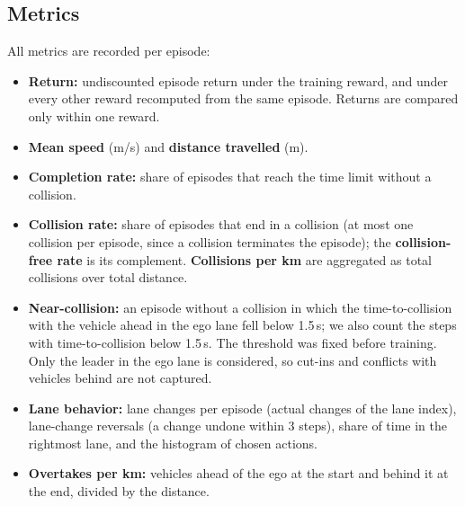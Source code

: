 \subsection{Metrics}\label{sec:metrics}
All metrics are recorded per episode:
\begin{itemize}
  \item \textbf{Return:} undiscounted episode return under the training reward, and under every other reward
        recomputed from the same episode. Returns are compared only within one reward.
  \item \textbf{Mean speed} (m/s) and \textbf{distance travelled} (m).
  \item \textbf{Completion rate:} share of episodes that reach the time limit without a collision.
  \item \textbf{Collision rate:} share of episodes that end in a collision (at most one collision per episode, since a
        collision terminates the episode); the \textbf{collision-free rate} is its complement. \textbf{Collisions per
        km} are aggregated as total collisions over total distance.
  \item \textbf{Near-collision:} an episode without a collision in which the time-to-collision with the vehicle ahead
        in the ego lane fell below 1.5\,s; we also count the steps with time-to-collision below 1.5\,s. The threshold
        was fixed before training. Only the leader in the ego lane is considered, so cut-ins and conflicts with
        vehicles behind are not captured.
  \item \textbf{Lane behavior:} lane changes per episode (actual changes of the lane index), lane-change reversals
        (a change undone within 3 steps), share of time in the rightmost lane, and the histogram of chosen actions.
  \item \textbf{Overtakes per km:} vehicles ahead of the ego at the start and behind it at the end, divided by the
        distance.
\end{itemize}

